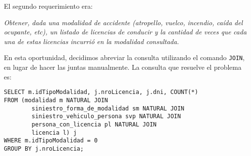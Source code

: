 El segundo requerimiento era:

\textit{Obtener, dada una modalidad de accidente (atropello, vuelco, incendio, caída del ocupante, etc), un listado de licencias de conducir y la cantidad de veces que cada una de estas licencias incurrió en la modalidad consultada.}

En esta oportunidad, decidimos abreviar la consulta utilizando el comando \texttt{JOIN}, en lugar de hacer las juntas manualmente. La consulta que resuelve el problema es:

\begin{verbatim}
SELECT m.idTipoModalidad, j.nroLicencia, j.dni, COUNT(*)
FROM (modalidad m NATURAL JOIN 
        siniestro_forma_de_modalidad sm NATURAL JOIN 
        siniestro_vehiculo_persona svp NATURAL JOIN 
        persona_con_licencia pl NATURAL JOIN 
        licencia l) j
WHERE m.idTipoModalidad = 0
GROUP BY j.nroLicencia;
\end{verbatim}